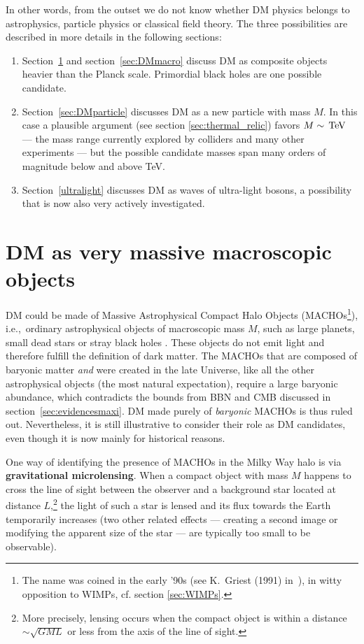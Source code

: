 \medskip

In other words, from the outset we do not  know whether DM physics belongs to astrophysics, particle physics or classical field theory.
The three possibilities are described in more details in the following sections:
\begin{enumerate}
\item Section~\ref{MACHO} and section~\ref{sec:DMmacro} discuss DM as composite objects heavier than the Planck scale. Primordial black holes are one possible candidate.
 \item Section~\ref{sec:DMparticle}  discusses DM as a new particle with mass $M$. In this case a plausible argument (see section \ref{sec:thermal_relic}) favors $M\sim \,{\rm TeV}$ --- the mass range currently explored by colliders and many other experiments --- but the possible candidate masses span many orders of magnitude below and above TeV.
\item Section~\ref{ultralight}  discusses DM as waves of ultra-light bosons, a possibility that is now also very actively investigated.
\end{enumerate}






\section{DM as very massive macroscopic objects}\label{MACHO}
DM could be made of Massive Astrophysical Compact Halo Objects (MACHOs\footnote{The name was coined in the early '90s (see K.~Griest (1991) in~\cite{MACHO}), in witty opposition to WIMPs, cf. section \ref{sec:WIMPs}.}), i.e.,\ ordinary astrophysical objects of macroscopic mass $M$, such as large planets, small dead stars or stray black holes \cite{MACHO}. These objects do not emit light and therefore fulfill the definition of dark matter. The MACHOs that are composed of baryonic matter {\em and} were created in the late Universe, like all the other astrophysical objects (the most natural expectation), require a large baryonic abundance, which contradicts the bounds from BBN and CMB discussed in section~\ref{sec:evidencesmaxi}.
DM made purely of {\em baryonic} MACHOs is thus ruled out. Nevertheless, it is still illustrative to consider their role as DM candidates, even though it is now mainly for historical reasons.

\medskip 


One way of identifying the presence of MACHOs in the Milky Way halo is via {\bf gravitational microlensing}. 
When a compact object with mass $M$ happens to cross the line of sight between the observer and a background star located at distance $L$,\footnote{More precisely, lensing occurs when the compact object is within a distance $\sim \sqrt{G M L}$ or less from the axis of the line of sight.} the light of such a star is lensed and its flux towards the Earth temporarily increases (two other related effects --- creating a second image or modifying the apparent size of the star --- are typically too small to be observable).

